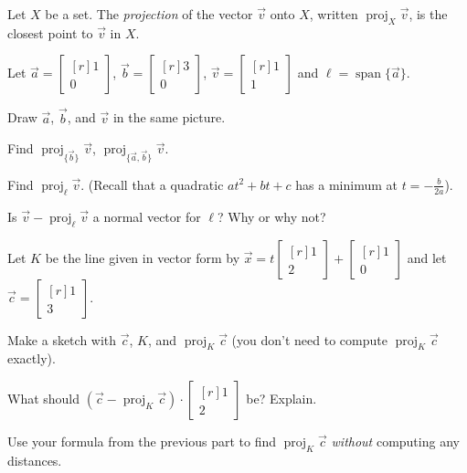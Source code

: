 \documentclass{problemset}
\DeclareMathOperator{\Span}{span}
\DeclareMathOperator{\Proj}{proj}
\newcommand{\mat}[1]{\begin{bmatrix*}[r]#1\end{bmatrix*}}
\begin{document}
	\begin{definition}[Projection]
		Let $X$ be a set. The \emph{projection} of the vector $\vec v$
		onto $X$, written $\Proj_X\vec v$, is the closest point to $\vec v$ in $X$.
	\end{definition}

	\question
	Let $\vec a=\mat{1\\0}$, $\vec b=\mat{3\\0}$, $\vec v=\mat{1\\1}$ and
	$\ell=\Span\{\vec a\}$.
	\begin{parts}
		\item Draw $\vec a$, $\vec b$, and $\vec v$ in the same picture.
		\item Find $\Proj_{\{\vec b\}}\vec v$, $\Proj_{\{\vec a,\vec b\}}\vec v$.
		\item Find $\Proj_\ell \vec v$. (Recall that a quadratic $at^2+bt+c$ has a
			minimum at $t=-\tfrac{b}{2a}$).
		\item Is $\vec v-\Proj_\ell \vec v$ a normal vector for $\ell$?
			Why or why not?
	\end{parts}

	\question
	Let $K$ be the line given in vector form by $\vec x=t\mat{1\\2}+\mat{1\\0}$ and let
	$\vec c=\mat{1\\3}$.
	\begin{parts}
		\item Make a sketch with $\vec c$, $K$, and $\Proj_K\vec c$ (you don't need to compute 
		$\Proj_K\vec c$ exactly).
		\item What should $(\vec c-\Proj_K\vec c)\cdot \mat{1\\2}$ be? Explain.
		\item Use your formula from the previous part to find $\Proj_K\vec c$
			\emph{without} computing any distances.
	\end{parts}
\end{document}
